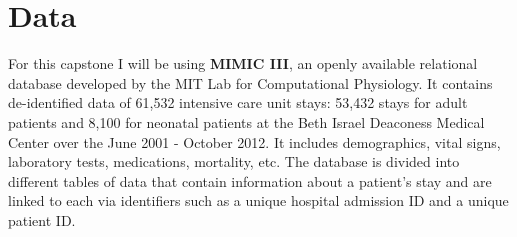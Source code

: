 \section{Data}

For this capstone I will be using \textbf{MIMIC III}, an openly available relational database developed by the MIT Lab for Computational Physiology. It contains de-identified data of 61,532 intensive care unit stays: 53,432 stays for adult patients and 8,100 for neonatal patients at the Beth Israel Deaconess Medical Center over the June 2001 - October 2012. It includes demographics, vital signs, laboratory tests, medications, mortality, etc. The database is divided into different tables of data that contain information about a patient's stay and are linked to each via identifiers such as a unique hospital admission ID and a unique patient ID. 





